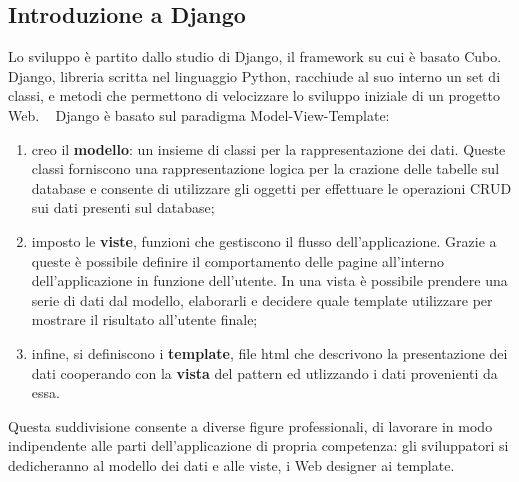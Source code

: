 \documentclass[12pt,a4paper]{article}
\begin{document}
\subsection{Introduzione a Django}
Lo sviluppo è partito dallo studio di Django, il framework su cui è basato Cubo.
Django, libreria scritta nel linguaggio Python, racchiude al suo interno un set di classi, e metodi che permettono di velocizzare lo sviluppo iniziale di un progetto Web.
~\label{mvt}
Django è basato sul paradigma Model-View-Template:
\begin{enumerate}
    \item creo il \textbf{modello}: un insieme di classi per la rappresentazione dei dati. Queste classi forniscono una rappresentazione logica per la crazione delle tabelle sul database e consente di utilizzare gli oggetti per effettuare le operazioni CRUD sui dati presenti sul database;
    \item imposto le \textbf{viste}, funzioni che gestiscono il flusso dell’applicazione. Grazie a queste è possibile definire il comportamento delle pagine all’interno dell’applicazione in funzione dell'utente. In una vista è possibile prendere una serie di dati dal modello, elaborarli e decidere quale template utilizzare per mostrare il risultato all’utente finale;
    \item infine, si definiscono i \textbf{template}, file html che descrivono la presentazione dei dati cooperando con la \textbf{vista} del pattern ed utlizzando i dati provenienti da essa.
\end{enumerate}

Questa suddivisione consente a diverse figure professionali, di lavorare in modo indipendente alle parti dell’applicazione di propria competenza: gli sviluppatori si dedicheranno al modello dei dati e alle viste, i Web designer ai template.
\end{document}
